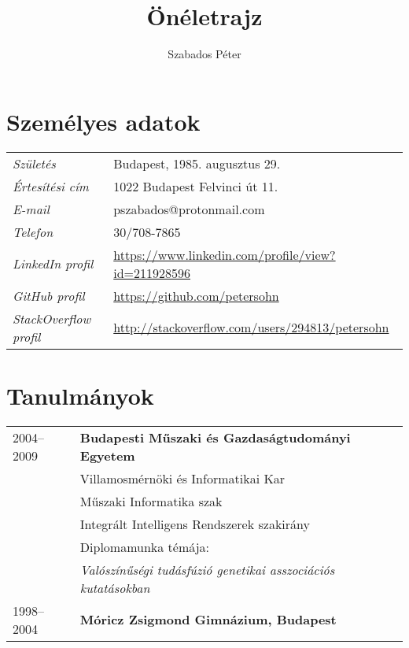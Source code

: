 \documentclass[a4paper,10pt]{article}
\title{\textbf{Önéletrajz}}
\author{Szabados Péter}
\newcommand{\pont}[1]{\emph{#1}}
\begin{document}
\maketitle

\section*{Személyes adatok}
\begin{tabular}{ll}
 \pont{Születés}&Budapest, 1985. augusztus 29.\\
 \pont{Értesítési cím}&1022 Budapest Felvinci út 11.\\
 \pont{E-mail}&pszabados@protonmail.com\\
 \pont{Telefon}&30/708-7865\\
 \pont{LinkedIn profil}&\href{https://www.linkedin.com/profile/view?id=211928596}{https://www.linkedin.com/profile/view?id=211928596}\\
 \pont{GitHub profil}&\href{https://github.com/petersohn}{https://github.com/petersohn}\\
 \pont{StackOverflow profil}&\href{http://stackoverflow.com/users/294813/petersohn}{http://stackoverflow.com/users/294813/petersohn}\\
\end{tabular}

\section*{Tanulmányok}
\begin{tabular}{ll}
 2004--2009
  &\textbf{Budapesti Műszaki és Gazdaságtudományi Egyetem}\\
  &Villamosmérnöki és Informatikai Kar\\
  &Műszaki Informatika szak\\
  &Integrált Intelligens Rendszerek szakirány\\
  &Diplomamunka témája:\\
  &\emph{Valószínűségi tudásfúzió genetikai asszociációs kutatásokban}\\
  1998--2004&\textbf{Móricz Zsigmond Gimnázium, Budapest}
\end{tabular}
\end{document}
